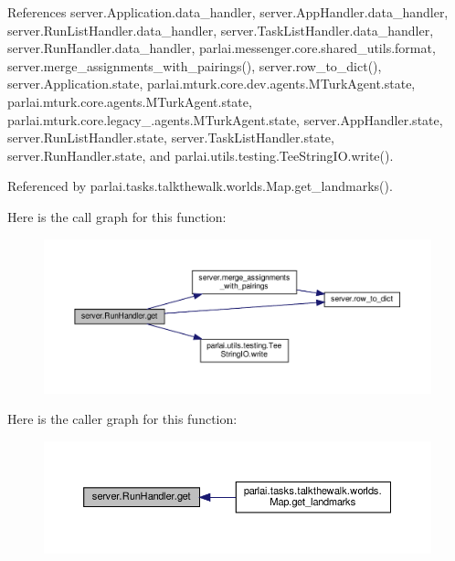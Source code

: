 References server.\+Application.\+data\+\_\+handler, server.\+App\+Handler.\+data\+\_\+handler, server.\+Run\+List\+Handler.\+data\+\_\+handler, server.\+Task\+List\+Handler.\+data\+\_\+handler, server.\+Run\+Handler.\+data\+\_\+handler, parlai.\+messenger.\+core.\+shared\+\_\+utils.\+format, server.\+merge\+\_\+assignments\+\_\+with\+\_\+pairings(), server.\+row\+\_\+to\+\_\+dict(), server.\+Application.\+state, parlai.\+mturk.\+core.\+dev.\+agents.\+M\+Turk\+Agent.\+state, parlai.\+mturk.\+core.\+agents.\+M\+Turk\+Agent.\+state, parlai.\+mturk.\+core.\+legacy\+\_.\+agents.\+M\+Turk\+Agent.\+state, server.\+App\+Handler.\+state, server.\+Run\+List\+Handler.\+state, server.\+Task\+List\+Handler.\+state, server.\+Run\+Handler.\+state, and parlai.\+utils.\+testing.\+Tee\+String\+I\+O.\+write().



Referenced by parlai.\+tasks.\+talkthewalk.\+worlds.\+Map.\+get\+\_\+landmarks().

Here is the call graph for this function\+:
\nopagebreak
\begin{figure}[H]
\begin{center}
\leavevmode
\includegraphics[width=350pt]{classserver_1_1RunHandler_a3dd94b1f7d68486782facb8bdbc74957_cgraph}
\end{center}
\end{figure}
Here is the caller graph for this function\+:
\nopagebreak
\begin{figure}[H]
\begin{center}
\leavevmode
\includegraphics[width=350pt]{classserver_1_1RunHandler_a3dd94b1f7d68486782facb8bdbc74957_icgraph}
\end{center}
\end{figure}
\mbox{\label{classserver_1_1RunHandler_a788d5598d824abeca0a5e0ff0747eb68}} 
